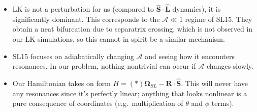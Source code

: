 \documentclass[
        fleqn,
        usenatbib,
    ]{mnras}
\newcommand*{\bm}[1]{\boldsymbol{\mathbf{#1}}}
\newcommand*{\uv}[1]{\hat{\bm{#1}}}
\newcommand*{\p}[1]{\left(#1\right)}
\begin{document}
\begin{itemize}
    \item LK is not a perturbation for us (compared to $\uv{S} \cdot \uv{L}$
        dynamics), it is significantly dominant. This corresponds to the
        $\mathcal{A} \ll 1$ regime of SL15. They obtain a neat bifurcation due
        to separatrix crossing, which is not observed in our LK simulations, so
        this cannot in spirit be a similar mechanism.

    \item SL15 focuses on adiabatically changing $\mathcal{A}$ and seeing how it
        encounters resonances. In our problem, nothing nontrivial can occur if
        $\mathcal{A}$ changes slowly.

    \item Our Hamiltonian takes on form $H = \p*{\bm{\Omega}_{SL} - \bm{R}}
        \cdot \uv{S}$. This will never have any resonances since it's perfectly
        linear; anything that looks nonlinear is a pure consequence of
        coordinates (e.g.\ multiplication of $\theta$ and $\phi$ terms).
\end{itemize}





\bsp
\label{lastpage} %
\end{document}
